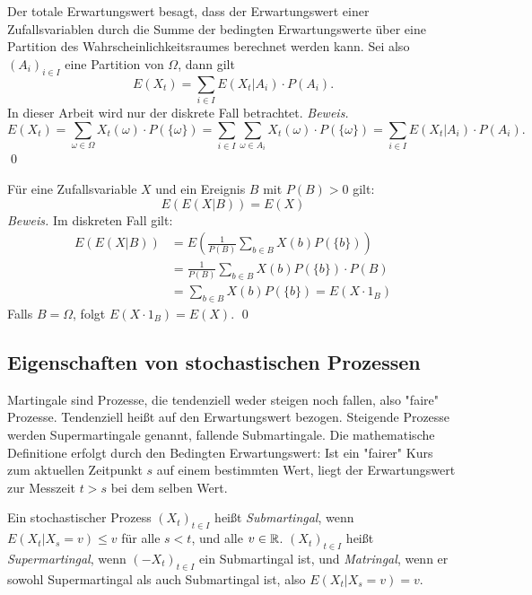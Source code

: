 \begin{satz}
Der totale Erwartungswert besagt, dass der Erwartungswert einer Zufallsvariablen
durch die Summe der bedingten Erwartungswerte über eine Partition des Wahrscheinlichkeitsraumes
berechnet werden kann. Sei also $(A_i)_{i \in I}$ eine Partition von $\Omega$,
dann gilt $$E(X_t) = \sum_{i \in I} E(X_t|A_i) \cdot P(A_i).$$
In dieser Arbeit wird nur der diskrete Fall betrachtet. \textit{Beweis.}
$$E(X_t) = \sum_{\omega \in \Omega} X_t(\omega) \cdot P(\{\omega\}) = \sum_{i \in I} \sum_{\omega \in A_i} X_t(\omega) \cdot P(\{\omega\}) = \sum_{i \in I} E(X_t|A_i) \cdot P(A_i).$$
\qed

\end{satz}

\begin{satz}
Für eine Zufallsvariable $X$ und ein Ereignis $B$ mit $P(B) > 0$ gilt:
$$
E(E(X|B)) = E(X)
$$
\textit{Beweis.} Im diskreten Fall gilt:
$$
\begin{aligned}
E(E(X|B)) &= E\left(\frac{1}{P(B)} \sum_{b \in B} X(b) P(\{b\})\right) 
\\ &= \frac{1}{P(B)} \sum_{b \in B} X(b) P(\{b\}) \cdot P(B) 
\\ &= \sum_{b \in B} X(b) P(\{b\}) = E(X \cdot 1_B)
\end{aligned}
$$
Falls $B = \Omega$, folgt $E(X \cdot 1_B) = E(X)$. \qed
\end{satz}

\subsection{Eigenschaften von stochastischen Prozessen}

\begin{defi}[Martingal]
Martingale sind Prozesse, die tendenziell weder steigen noch fallen, 
also "faire" Prozesse. Tendenziell heißt auf den Erwartungswert bezogen. 
Steigende Prozesse werden Supermartingale genannt, fallende Submartingale. 
Die mathematische Definitione erfolgt durch den Bedingten Erwartungswert: 
Ist ein "fairer" Kurs zum aktuellen Zeitpunkt $s$ auf einem bestimmten Wert, 
liegt der Erwartungswert zur Messzeit $t \gt s$ bei dem selben Wert.

Ein stochastischer Prozess $(X_t)_{t \in I}$ heißt \textit{Submartingal}, wenn 
$E(X_t|X_s=v) \le v$  für alle $s \lt t$, und alle $v \in \Bbb R$. $(X_t)_{t \in I}$
 heißt \textit{Supermartingal}, wenn  $(-X_t)_{t \in I}$ ein Submartingal ist, und \textit{Matringal}, 
 wenn er sowohl Supermartingal als auch Submartingal ist, also $E(X_t|X_s=v) = v$.
\end{defi}

